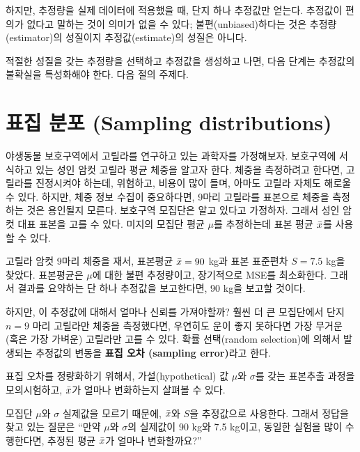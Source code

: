 
하지만, 추정량을 실제 데이터에 적용했을 때,
단지 하나 추정값만 얻는다. 추정값이 편의가 없다고 말하는 것이 의미가 없을 수 있다; 불편(unbiased)하다는 것은 추정량(estimator)의 성질이지 추정값(estimate)의 성질은 아니다.

적절한 성질을 갖는 추정량을 선택하고 추정값을 생성하고 나면, 다음 단계는 추정값의 불확실을 특성화해야 한다. 다음 절의 주제다.


\section{표집 분포 (Sampling distributions)}
\label{gorilla}

야생동물 보호구역에서 고릴라를 연구하고 있는 과학자를 가정해보자.
보호구역에 서식하고 있는 성인 암컷 고릴라 평균 체중을 알고자 한다.
체중을 측정하려고 한다면, 고릴라를 진정시켜야 하는데, 위험하고, 비용이 많이 들며, 아마도 고릴라 자체도 해로울 수 있다.
하지만, 체중 정보 수집이 중요하다면, 9마리 고릴라를 표본으로 체중을 측정하는 것은 용인될지 모른다.
보호구역 모집단은 알고 있다고 가정하자. 그래서 성인 암컷 대표 표본을 고를 수 있다. 미지의 모집단 평균 $\mu$를 추정하는데 표본 평균 $\bar{x}$를 사용할 수 있다.

고릴라 암컷 9마리 체중을 재서, 표본평균 $\bar{x}=90$ kg과 표본 표준편차 $S=7.5$ kg을 찾았다. 
표본평균은 $\mu$에 대한 불편 추정량이고, 장기적으로 MSE를 최소화한다. 그래서 결과를 요약하는 단 하나 추정값을 보고한다면, 90 kg을 보고할 것이다.

하지만, 이 추정값에 대해서 얼마나 신뢰를 가져야할까?
훨씬 더 큰 모집단에서 단지 $n=9$ 마리 고릴라만 체중을 측정했다면, 우연히도 운이 좋지 못하다면 가장 무거운 (혹은 가장 가벼운) 고릴라만 고를 수 있다.
확률 선택(random selection)에 의해서 발생되는 추정값의 변동을 {\bf 표집 오차 (sampling error)}라고 한다.

표집 오차를 정량화하기 위해서, 가설(hypothetical) 값 $\mu$와 $\sigma$를 갖는 표본추출 과정을 모의시험하고, $\bar{x}$가 얼마나 변화하는지 살펴볼 수 있다.

모집단 $\mu$와 $\sigma$ 실제값을 모르기 때문에, 
$\bar{x}$와 $S$을 추정값으로 사용한다. 
그래서 정답을 찾고 있는 질문은
``만약 $\mu$와 $\sigma$의 실제값이 90 kg와 7.5 kg이고,
동일한 실험을 많이 수행한다면, 추정된 평균 $\bar{x}$가 얼마나 변화할까요?''

